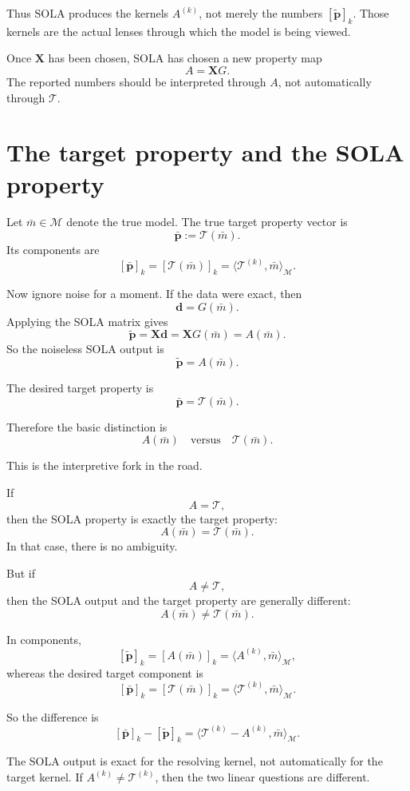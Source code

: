 \documentclass[11pt,openany]{book}
\theoremstyle{definition}
\theoremstyle{remark}
\newcommand{\M}{\mathcal M}
\newcommand{\Tau}{\mathcal{T}}
\begin{document}
Thus SOLA produces the kernels \(A^{(k)}\), not merely the numbers
\([\widetilde{\mathbf p}]_k\). Those kernels are the actual lenses through which the model is
being viewed.

\begin{checkpointbox}
Once \(\mathbf X\) has been chosen, SOLA has chosen a new property map
\[
  A=\mathbf XG.
\]
The reported numbers should be interpreted through \(A\), not automatically through \(\Tau\).
\end{checkpointbox}

\section{The target property and the SOLA property}

Let \(\bar m\in\M\) denote the true model. The true target property vector is
\[
  \bar{\mathbf p}
  :=
  \Tau(\bar m).
\]
Its components are
\[
  [\bar{\mathbf p}]_k
  =
  [\Tau(\bar m)]_k
  =
  \langle \mathcal T^{(k)},\bar m\rangle_{\M}.
\]

Now ignore noise for a moment. If the data were exact, then
\[
  \mathbf d=G(\bar m).
\]
Applying the SOLA matrix gives
\[
  \widetilde{\mathbf p}
  =
  \mathbf X\mathbf d
  =
  \mathbf XG(\bar m)
  =
  A(\bar m).
\]
So the noiseless SOLA output is
\[
  \widetilde{\mathbf p}=A(\bar m).
\]

The desired target property is
\[
  \bar{\mathbf p}=\Tau(\bar m).
\]

Therefore the basic distinction is
\[
  A(\bar m)
  \quad\text{versus}\quad
  \Tau(\bar m).
\]

This is the interpretive fork in the road.

If
\[
  A=\Tau,
\]
then the SOLA property is exactly the target property:
\[
  A(\bar m)=\Tau(\bar m).
\]
In that case, there is no ambiguity.

But if
\[
  A\neq \Tau,
\]
then the SOLA output and the target property are generally different:
\[
  A(\bar m)\neq \Tau(\bar m).
\]

In components,
\[
  [\widetilde{\mathbf p}]_k
  =
  [A(\bar m)]_k
  =
  \langle A^{(k)},\bar m\rangle_{\M},
\]
whereas the desired target component is
\[
  [\bar{\mathbf p}]_k
  =
  [\Tau(\bar m)]_k
  =
  \langle \mathcal T^{(k)},\bar m\rangle_{\M}.
\]

So the difference is
\[
  [\bar{\mathbf p}]_k-[\widetilde{\mathbf p}]_k
  =
  \langle \mathcal T^{(k)}-A^{(k)},\bar m\rangle_{\M}.
\]

\begin{warningbox}
The SOLA output is exact for the resolving kernel, not automatically for the target kernel.
If \(A^{(k)}\neq\mathcal T^{(k)}\), then the two linear questions are different.
\end{warningbox}
\end{document}

